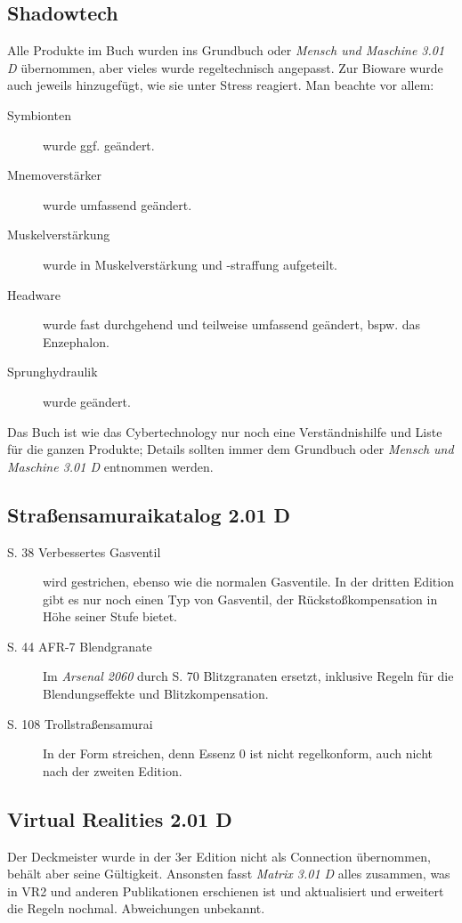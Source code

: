 \documentclass[a4paper]{scrartcl}
\begin{document}
\subsection{Shadowtech}
Alle Produkte im Buch wurden ins Grundbuch oder \textit{Mensch und Maschine 3.01 D} übernommen, aber vieles wurde regeltechnisch angepasst. Zur Bioware wurde auch jeweils hinzugefügt, wie sie unter Stress reagiert. Man beachte vor allem:
\begin{description}
 \item[Symbionten] wurde ggf. geändert.
 \item[Mnemoverstärker] wurde umfassend geändert.
 \item[Muskelverstärkung] wurde in Muskelverstärkung und -straffung aufgeteilt.
 \item[Headware] wurde fast durchgehend und teilweise umfassend geändert, bspw. das Enzephalon.
 \item[Sprunghydraulik] wurde geändert.
\end{description}
Das Buch ist wie das Cybertechnology nur noch eine Verständnishilfe und Liste für die ganzen Produkte; Details sollten immer dem Grundbuch oder \textit{Mensch und Maschine 3.01 D} entnommen werden.

\subsection{Straßensamuraikatalog 2.01 D}
\begin{description}
 \item[S. 38 Verbessertes Gasventil] wird gestrichen, ebenso wie die normalen Gasventile. In der dritten Edition gibt es nur noch einen Typ von Gasventil, der Rückstoßkompensation in Höhe seiner Stufe bietet.
 \item[S. 44 AFR-7 Blendgranate] Im \textit{Arsenal 2060} durch S. 70 Blitzgranaten ersetzt, inklusive Regeln für die Blendungseffekte und Blitzkompensation.
 \item[S. 108 Trollstraßensamurai] In der Form streichen, denn Essenz 0 ist nicht regelkonform, auch nicht nach der zweiten Edition.
\end{description}

\subsection{Virtual Realities 2.01 D}
Der Deckmeister wurde in der 3er Edition nicht als Connection übernommen, behält aber seine Gültigkeit. Ansonsten fasst \textit{Matrix 3.01 D} alles zusammen, was in VR2 und anderen Publikationen erschienen ist und aktualisiert und erweitert die Regeln nochmal. Abweichungen unbekannt.
\end{document}
